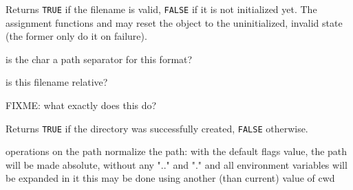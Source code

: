 Returns {\tt TRUE} if the filename is valid, {\tt FALSE} if it is not
initialized yet. The assignment functions and
 may reset the object to the uninitialized,
invalid state (the former only do it on failure).

\label{wxfilenameispathseparator}


is the char a path separator for this format?


\label{wxfilenameisrelative}


is this filename relative?


\label{wxfilenameiswild}


FIXME: what exactly does this do?


\label{wxfilenamemkdir}







Returns {\tt TRUE} if the directory was successfully created, {\tt FALSE}
otherwise.

\label{wxfilenamenormalize}


operations on the path
normalize the path: with the default flags value, the path will be
made absolute, without any ".." and "." and all environment
variables will be expanded in it
this may be done using another (than current) value of cwd


